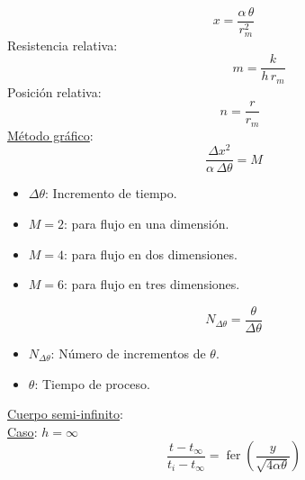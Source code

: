 \documentclass[letter,oneside,10pt]{article}
\DeclareMathOperator{\fer}{fer}
\begin{document}
\begin{multicols}{3}
\begin{equation*}
    x = \frac{\alpha\,\theta}{r_m^2}
\end{equation*}
Resistencia relativa:
\vspace{-0.4cm}
\begin{equation*}
    \quad\quad\quad\quad m = \frac{k}{h\,r_m}
\end{equation*}
Posición relativa:
\vspace{-0.4cm}
\begin{equation*}
    \quad n = \frac{r}{r_m}
\end{equation*}
\underline{Método gráfico}:
\begin{equation*}
    \frac{\Delta x^2}{\alpha\,\Delta\theta}=M
\end{equation*}
\tiny
\begin{itemize}
    \item $\Delta\theta$: Incremento de tiempo.
    \item $M=2$: para flujo en una dimensión.
    \item $M=4$: para flujo en dos dimensiones.
    \item $M=6$: para flujo en tres dimensiones.
\end{itemize}
\scriptsize
\begin{equation*}
    N_{\Delta\theta}=\frac{\theta}{\Delta\theta}
\end{equation*}
\tiny
\begin{itemize}
    \item $N_{\Delta\theta}$: Número de incrementos de $\theta$.
    \item $\theta$: Tiempo de proceso.
\end{itemize}
\scriptsize
\underline{Cuerpo semi-infinito}:\\
\underline{Caso}: $h=\infty$
\begin{equation*}
    \frac{t-t_\infty}{t_i-t_\infty} = \fer\left(
        \frac{y}{\sqrt{4\alpha\theta}}
    \right)
\end{equation*}
\tiny
\begin{itemize}

\end{itemize}
\end{multicols}
\end{document}

